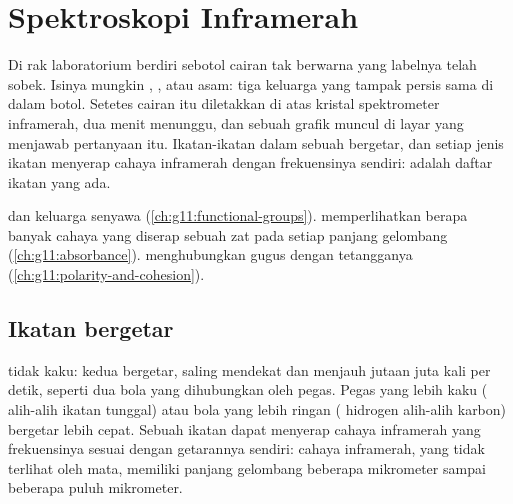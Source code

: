 \chapter{Spektroskopi Inframerah}\label{ch:g11:infrared}

Di rak laboratorium berdiri sebotol cairan tak berwarna yang labelnya
telah sobek. Isinya mungkin , , atau asam: tiga keluarga
yang tampak persis sama di dalam botol. Setetes cairan itu diletakkan di
atas kristal spektrometer inframerah, dua menit menunggu, dan sebuah
grafik muncul di layar yang menjawab pertanyaan itu. Ikatan-ikatan dalam
sebuah  bergetar, dan setiap jenis ikatan menyerap cahaya
inframerah dengan frekuensinya sendiri:  adalah
daftar ikatan yang ada.

\begin{recall}
 dan keluarga senyawa (\cref{ch:g11:functional-groups}).
 memperlihatkan berapa banyak cahaya yang diserap sebuah
zat pada setiap panjang gelombang (\cref{ch:g11:absorbance}).  menghubungkan gugus  dengan  tetangganya
(\cref{ch:g11:polarity-and-cohesion}).
\end{recall}

\section{Ikatan bergetar}

 tidak kaku: kedua  bergetar, saling mendekat dan
menjauh jutaan juta kali per detik, seperti dua bola yang dihubungkan
oleh pegas. Pegas yang lebih kaku ( alih-alih ikatan
tunggal) atau bola yang lebih ringan ( hidrogen alih-alih 
karbon) bergetar lebih cepat. Sebuah ikatan dapat menyerap cahaya
inframerah yang frekuensinya sesuai dengan getarannya sendiri: cahaya
inframerah, yang tidak terlihat oleh mata, memiliki panjang gelombang
beberapa mikrometer sampai beberapa puluh mikrometer.

